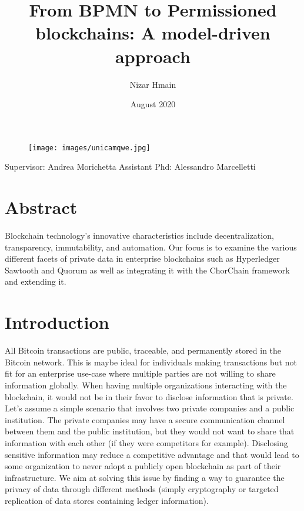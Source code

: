 \documentclass{article}
\title{From BPMN to Permissioned blockchains: A model-driven approach}
\author{Nizar Hmain }
\date{August 2020}
\begin{document}
\maketitle





\begin{figure}[hbt!]
 \centering
\texttt{[image: images/unicamqwe.jpg]}
\end{figure}


Supervisor: Andrea Morichetta \newline
Assistant Phd: Alessandro Marcelletti


\pagebreak


\tableofcontents

\section{Abstract}

Blockchain technology’s innovative characteristics include decentralization, transparency, immutability, and automation. Our focus is to examine the various different facets of private data in enterprise blockchains such as Hyperledger Sawtooth and Quorum as well as integrating it with the ChorChain framework and extending it. 




\section{Introduction}

All Bitcoin transactions are public, traceable, and permanently stored in the Bitcoin network. This is maybe ideal for individuals making transactions but not fit for an enterprise use-case where multiple parties are not willing to share information globally. When having multiple organizations interacting with the blockchain, it would not be in their favor to disclose information that is private. Let's assume a simple scenario that involves two private companies and a public institution. The private companies may have a secure communication channel between them and the public institution, but they would not want to share that information with each other (if they were competitors for example). Disclosing sensitive information may reduce a competitive advantage and that would lead to some organization to never adopt a publicly open blockchain as part of their infrastructure. We aim at solving this issue by finding a way to guarantee the privacy of data through different methods (simply cryptography or targeted replication of data stores containing ledger information). \newline
\end{document}
